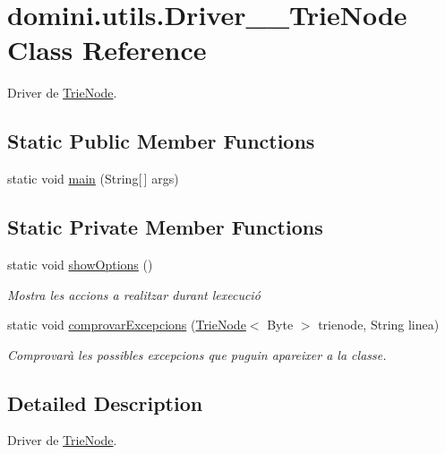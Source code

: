\hypertarget{classdomini_1_1utils_1_1Driver____TrieNode}{}\section{domini.\+utils.\+Driver\+\_\+\+\_\+\+Trie\+Node Class Reference}
\label{classdomini_1_1utils_1_1Driver____TrieNode}


Driver de \hyperlink{classdomini_1_1utils_1_1TrieNode}{Trie\+Node}.  


\subsection*{Static Public Member Functions}
\begin{DoxyCompactItemize}
\item 
static void \hyperlink{classdomini_1_1utils_1_1Driver____TrieNode_a19cb816408fb6b32cca0ea8ae8bc4153}{main} (String\mbox{[}$\,$\mbox{]} args)
\end{DoxyCompactItemize}
\subsection*{Static Private Member Functions}
\begin{DoxyCompactItemize}
\item 
static void \hyperlink{classdomini_1_1utils_1_1Driver____TrieNode_ab9e971ebb4f8e219efaab32c6654243a}{show\+Options} ()
\begin{DoxyCompactList}\small\item\em Mostra les accions a realitzar durant l\textquotesingle{}execució \end{DoxyCompactList}\item 
static void \hyperlink{classdomini_1_1utils_1_1Driver____TrieNode_aa763a74162f647ee153c5cea01d371d0}{comprovar\+Excepcions} (\hyperlink{classdomini_1_1utils_1_1TrieNode}{Trie\+Node}$<$ Byte $>$ trienode, String linea)
\begin{DoxyCompactList}\small\item\em Comprovarà les possibles excepcions que puguin apareixer a la classe. \end{DoxyCompactList}\end{DoxyCompactItemize}


\subsection{Detailed Description}
Driver de \hyperlink{classdomini_1_1utils_1_1TrieNode}{Trie\+Node}. 

